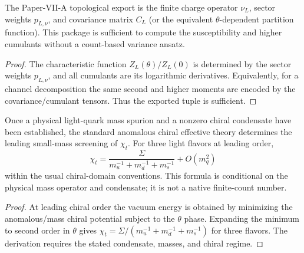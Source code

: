 \documentclass[12pt,a4paper]{article}
\begin{document}
\begin{corollary}
\label{p10:cor:full-primitive-topological-winding-block}
The Paper-VII-A topological export is the finite charge operator \(\nu_L\), sector weights \(p_{L,\nu}\), and covariance matrix \(C_L\) (or the equivalent \(\theta\)-dependent partition function).  This package is sufficient to compute the susceptibility and higher cumulants without a count-based variance ansatz.
\end{corollary}
\begin{proof}
The characteristic function $Z_L(\theta)/Z_L(0)$ is determined by the sector weights $p_{L,\nu}$, and all cumulants are its logarithmic derivatives.  Equivalently, for a channel decomposition the same second and higher moments are encoded by the covariance/cumulant tensors.  Thus the exported tuple is sufficient.
\end{proof}

\begin{theorem}
\label{p10:thm:light-quark-screened-full-qcd-topology}
Once a physical light-quark mass spurion and a nonzero chiral condensate have been established, the standard anomalous chiral effective theory determines the leading small-mass screening of \(\chi_t\).  For three light flavors at leading order,
\begin{equation}
\chi_t=\frac{\Sigma}{m_u^{-1}+m_d^{-1}+m_s^{-1}}+O(m_q^2)
\end{equation}
within the usual chiral-domain conventions.  This formula is conditional on the physical mass operator and condensate; it is not a native finite-count number.
\end{theorem}
\begin{proof}
At leading chiral order the vacuum energy is obtained by minimizing the anomalous/mass chiral potential subject to the $\theta$ phase.  Expanding the minimum to second order in $\theta$ gives $\chi_t=\Sigma/(m_u^{-1}+m_d^{-1}+m_s^{-1})$ for three flavors.  The derivation requires the stated condensate, masses, and chiral regime.
\end{proof}
\end{document}
